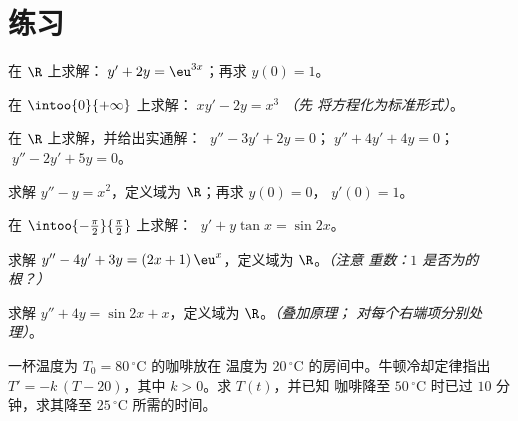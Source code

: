 \section{练习}

\begin{exercise}[$\star$]\label{exo:b1:diffeq:1}
在 $\R$ 上求解：$\;y' + 2y = \eu^{3x}$；再求 $y(0) =
1$。
\end{exercise}

\begin{exercise}[$\star$]\label{exo:b1:diffeq:2}
在 $\intoo{0}{+\infty}$ 上求解：$\;x y' - 2y = x^3$ \emph{（先
将方程化为标准形式）}。
\end{exercise}

\begin{exercise}[$\star$]\label{exo:b1:diffeq:3}
在 $\R$ 上求解，并给出实通解：
$\;y'' - 3y' + 2y = 0$；$\;y'' + 4y' + 4y = 0$；$\;y'' - 2y' + 5y =
0$。
\end{exercise}

\begin{exercise}[$\star$]\label{exo:b1:diffeq:4}
求解 $y'' - y = x^2$，定义域为 $\R$；再求 $y(0) = 0$，
$y'(0) = 1$。
\end{exercise}

\begin{exercise}[$\star\star$]\label{exo:b1:diffeq:5}
在 $\intoo{-\frac\pi2}{\frac\pi2}$ 上求解：
$\;y' + y\tan x = \sin 2x$。
\end{exercise}

\begin{exercise}[$\star\star$]\label{exo:b1:diffeq:6}
求解 $y'' - 4y' + 3y = (2x + 1)\,\eu^{x}$，定义域为 $\R$。\emph{（注意
重数：$1$ 是否为的根？）}
\end{exercise}

\begin{exercise}[$\star\star$]\label{exo:b1:diffeq:7}
求解 $y'' + 4y = \sin 2x + x$，定义域为 $\R$。\emph{（叠加原理；
对每个右端项分别处理）}。
\end{exercise}

\begin{exercise}[$\star\star$]\label{exo:b1:diffeq:8}
一杯温度为 $T_0 = 80\,^\circ$C 的咖啡放在
温度为 $20\,^\circ$C 的房间中。牛顿冷却定律指出 $T' = -k\,(T - 20)$，其中
$k > 0$。求 $T(t)$，并已知
咖啡降至 $50\,^\circ$C 时已过 $10$ 分钟，求其降至
$25\,^\circ$C 所需的时间。
\end{exercise}

